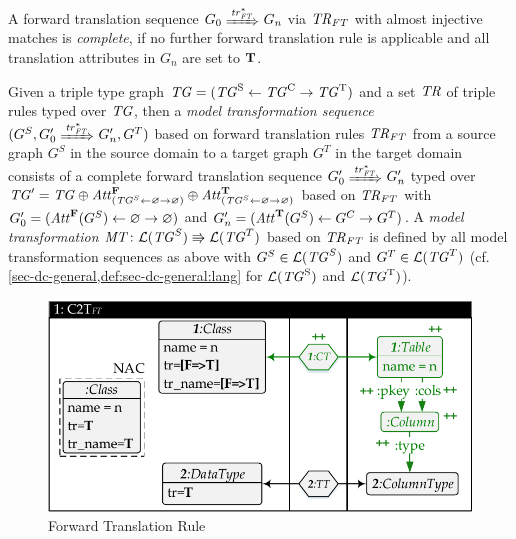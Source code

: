\begin{definition}
\label{def:sec-mt-tgg:compl_ft}
A forward translation sequence $G_0 \Trans{\tr^*_{\FT}} G_n$ via $\mathit{TR}_\mathit{FT}$ with almost injective matches is \emph{complete}, if no further forward translation rule is applicable and all translation attributes in $G_n$ are set to $\mathbf{T}$.
\envEndMarker
\end{definition}

\begin{definition}
\label{def:sec-mt-tgg:mt_ft}
Given a triple type graph $\mathit{TG}=(\mathit{TG}^\mathrm{S} \gets \mathit{TG}^\mathrm{C} \to \mathit{TG}^\mathrm{T})$ and a set $\mathit{TR}$ of triple rules typed over $\mathit{TG}$, then a \emph{model transformation sequence} $(G^S,G'_0 \Trans{\tr^*_{\FT}} G'_n,G^T)$ based on forward translation rules $\mathit{TR}_{\mathit{FT}}$ from a source graph $G^S$ in the source domain to a target graph $G^T$ in the target domain consists of a complete forward translation sequence $G'_0 \Trans{\tr^*_{\FT}} G'_n$ typed over $\mathit{TG}'=\mathit{TG} \oplus \mathit{Att}^\mathbf{F}_{(\mathit{TG}^S \gets \varnothing \to \varnothing)} \oplus \mathit{Att}^\mathbf{T}_{(\mathit{TG}^S \gets \varnothing \to \varnothing)}$ based on $\mathit{TR}_{\mathit{FT}}$ with $G'_0=(\mathit{Att}^\mathbf{F}(G^S) \gets \varnothing \to \varnothing)$ and $G'_n=(\mathit{Att}^\mathbf{T}(G^S) \gets G^C \to G^T)$.
A \emph{model transformation} $\mathit{MT}\colon \mathcal{L}(\mathit{TG}^S) \Rrightarrow \mathcal{L}(\mathit{TG}^T)$ based on $\mathit{TR}_{\mathit{FT}}$ is defined by all model transformation sequences as above with $G^S \in \mathcal{L}(\mathit{TG}^S)$ and $G^T \in \mathcal{L}(\mathit{TG}^T)$ (cf. \cref{sec-dc-general,def:sec-dc-general:lang} for $\mathcal{L}(\mathit{TG}^\mathrm{S})$ and $\mathcal{L}(\mathit{TG}^\mathrm{T})$).
\envEndMarker
\end{definition}

\begin{figure}[!tb]
\begin{center}
\includegraphics[width=.7\textwidth]{img/gen_intro/ft.pdf}
\end{center}
\caption{Forward Translation Rule}
\label{fig:sec-mt-tgg:fwd_tr_rule}
\end{figure}

